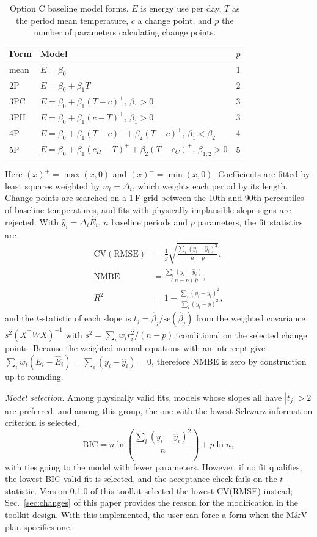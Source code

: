 \documentclass[10pt,twocolumn,letterpaper]{article}
\begin{document}
\begin{table}[t]
\caption{Option C baseline model forms. $E$ is energy use per day, $T$ as the period mean temperature, $c$ a change point, and $p$ the number of parameters calculating change points.}
\label{tab:forms}
\centering\small
\begin{tabular}{@{}lll@{}}
\toprule
Form & Model & $p$ \\
\midrule
mean & $E=\beta_0$ & 1 \\
2P & $E=\beta_0+\beta_1T$ & 2 \\
3PC & $E=\beta_0+\beta_1(T-c)^{+}$, $\beta_1>0$ & 3 \\
3PH & $E=\beta_0+\beta_1(c-T)^{+}$, $\beta_1>0$ & 3 \\
4P & $E=\beta_0+\beta_1(T-c)^{-}+\beta_2(T-c)^{+}$, $\beta_1<\beta_2$ & 4 \\
5P & $E=\beta_0+\beta_1(c_H-T)^{+}+\beta_2(T-c_C)^{+}$, $\beta_{1,2}>0$ & 5 \\
\bottomrule
\end{tabular}
\end{table}

Here $(x)^{+}=\max(x,0)$ and $(x)^{-}=\min(x,0)$. Coefficients are fitted by least squares weighted by $w_i=\Delta_i$, which weights each period by its length. Change points are searched on a 1\,F grid between the 10th and 90th percentiles of baseline temperatures, and fits with physically implausible slope signs are rejected. With $\hat y_i=\Delta_i\hat E_i$, $n$ baseline periods and $p$ parameters, the fit statistics are
\begin{align}
\mathrm{CV(RMSE)} &= \frac{1}{\bar y}\sqrt{\frac{\sum_i (y_i-\hat y_i)^2}{n-p}}, \label{eq:cv}\\
\mathrm{NMBE} &= \frac{\sum_i (y_i-\hat y_i)}{(n-p)\,\bar y}, \label{eq:nmbe}\\
R^2 &= 1-\frac{\sum_i (y_i-\hat y_i)^2}{\sum_i (y_i-\bar y)^2}, \label{eq:r2}
\end{align}
and the $t$-statistic of each slope is $t_j=\hat\beta_j/\mathrm{se}(\hat\beta_j)$ from the weighted covariance $s^2(X^{\top}WX)^{-1}$ with $s^2=\sum_i w_i r_i^2/(n-p)$, conditional on the selected change points. Because the weighted normal equations with an intercept give $\sum_i w_i(E_i-\hat E_i)=\sum_i(y_i-\hat y_i)=0$, therefore NMBE is zero by construction up to rounding.

\emph{Model selection.} Among physically valid fits, models whose slopes all have $|t_j|>2$ are preferred, and among this group, the one with the lowest Schwarz information criterion is selected,
\begin{equation}
\mathrm{BIC}=n\ln\!\left(\frac{\sum_i (y_i-\hat y_i)^2}{n}\right)+p\ln n,
\label{eq:bic}
\end{equation}
with ties going to the model with fewer parameters. However, if no fit qualifies, the lowest-BIC valid fit is selected, and the acceptance check fails on the $t$-statistic. Version 0.1.0 of this toolkit selected the lowest CV(RMSE) instead; Sec.~\ref{sec:changes} of this paper provides the reason for the modification in the toolkit design. With this implemented, the user can force a form when the M\&V plan specifies one.
\end{document}
